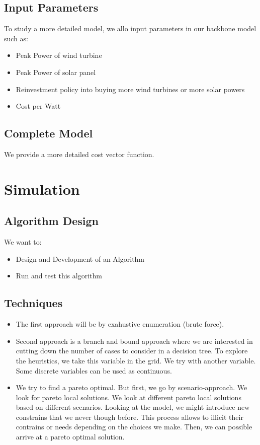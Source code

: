 \documentclass[12pt]{article}
\begin{document}
\subsection{Input Parameters}

To study a more detailed model, we allo input parameters in our backbone model such as:
\begin{itemize}
\item Peak Power of wind turbine
\item Peak Power of solar panel
\item Reinvestment policy into buying more wind turbines or more solar powers
\item Cost per Watt
\end{itemize}

\subsection{Complete Model}

We provide a more detailed cost vector function. 

\section{Simulation}

\subsection{Algorithm Design}

We want to:
\begin{itemize}
\item Design and Development of an Algorithm
\item Run and test this algorithm
\end{itemize}

\subsection{Techniques}

\begin{itemize}
\item The first approach will be by exahustive enumeration (brute force). 
\item Second approach is a branch and bound approach where we are interested in cutting down the number of cases to consider in a decision tree. To explore the heuristics, we take this variable in the grid. We try with another variable. Some discrete variables can be used as continuous. 
\item We try to find a pareto optimal. But first, we go by scenario-approach. We look for pareto local solutions. We look at different pareto local solutions based on different scenarios. Looking at the model, we might introduce new constrains that we never though before. This process allows to illicit their contrains or needs depending on the choices we make. Then, we can possible arrive at a pareto optimal solution. 
\end{itemize}
\end{document}
